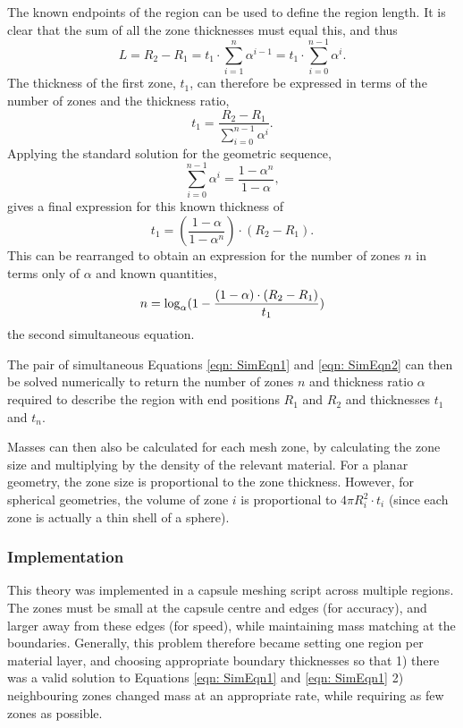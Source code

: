 The known endpoints of the region can be used to define the region length. It is clear that the sum of all the zone thicknesses must equal this, and thus
\begin{equation}{L = R_2 - R_1 = t_1 \cdot \sum_{i=1}^{n} \alpha^{i-1} = t_1 \cdot \sum_{i=0}^{n-1} \alpha^{i}.}\end{equation}
The thickness of the first zone, $t_1$, can therefore be expressed in terms of the number of zones and the thickness ratio,
\begin{equation}{t_1  = \frac{R_2 - R_1}{\sum_{i=0}^{n-1} \alpha^{i}}.}\end{equation}
Applying the standard solution for the geometric sequence, 
\begin{equation}{{\sum_{i=0}^{n-1} \alpha^{i}} = \frac{1 - \alpha^n}{1 - \alpha},}\end{equation}
gives a final expression for this known thickness of 
\begin{equation}{t_1  = ( \frac{1 - \alpha}{1 - \alpha^n} )\cdot (R_2 - R_1).}\end{equation}
This can be rearranged to obtain an expression for the number of zones $n$ in terms only of $\alpha$ and known quantities,
\begin{equation}{\label{eqn: SimEqn2} n  =  \log_{\alpha} (1 - \frac{ (1-\alpha) \cdot(R_2 - R_1)}{t_1} )}\end{equation}
the second simultaneous equation.

The pair of simultaneous Equations \ref{eqn: SimEqn1} and \ref{eqn: SimEqn2} can then be solved numerically to return the number of zones $n$ and thickness ratio $\alpha$ required to describe the region with end positions $R_1$ and $R_2$ and thicknesses $t_1$ and $t_n$.

Masses can then also be calculated for each mesh zone, by calculating the zone size and multiplying by the density of the relevant material. For a planar geometry, the zone size is proportional to the zone thickness. However, for spherical geometries, the volume of zone $i$ is proportional to $4 \pi R_i^2 \cdot t_i$ (since each zone is actually a thin shell of a sphere).

\subsubsection{Implementation}
This theory was implemented in a capsule meshing script across multiple regions. The zones must be small at the capsule centre and edges (for accuracy), and larger away from these edges (for speed), while maintaining mass matching at the boundaries. Generally, this problem therefore became setting one region per material layer, and choosing appropriate boundary thicknesses so that 1) there was a valid solution to Equations \ref{eqn: SimEqn1} and \ref{eqn: SimEqn1} 2) neighbouring zones changed mass at an appropriate rate, while requiring as few zones as possible.

